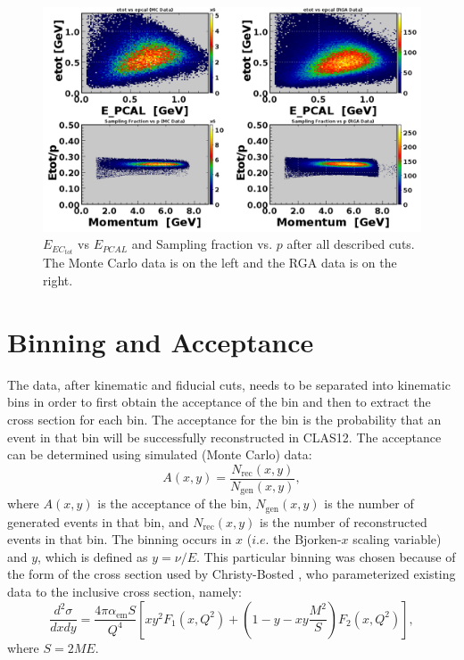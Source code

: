 \begin{figure}[h!]
	\centering
	\includegraphics[width=0.9\linewidth]{figures/rga/sampFrac.png}
	\caption{$E_{EC_{tot}}$ vs $E_{PCAL}$ and Sampling fraction vs. $p$ after all described cuts. The Monte Carlo data is on the left and the RGA data is on the right.}
	\label{fig:rga_sampFrac}
\end{figure}

\cleardoublepage
\section{Binning and Acceptance}
The data, after kinematic and fiducial cuts, needs to be separated into kinematic bins in order to first obtain the acceptance of the bin and then to extract the cross section for each bin. The acceptance for the bin is the probability that an event in that bin will be successfully reconstructed in CLAS12. The acceptance can be determined using simulated (Monte Carlo) data:
\begin{equation}
A(x,y) = \frac{N_{\mathrm{rec}}(x,y)}{N_{\mathrm{gen}}(x,y)},
\end{equation}
where $A(x,y)$ is the acceptance of the bin, $N_{\mathrm{gen}}(x,y)$ is the number of generated events in that bin, and $N_{\mathrm{rec}}(x,y)$ is the number of reconstructed events in that bin. The binning occurs in $x$ ($i.e.$ the Bjorken-$x$ scaling variable) and $y$, which is defined as $y = \nu/E$. This particular binning was chosen because of the form of the cross section used by Christy-Bosted \cite{christy_bosted}, who parameterized existing data to the inclusive cross section, namely:
\begin{equation}
\label{eq:dis_xsec}
\frac{d^2\sigma}{dxdy} = \frac{4\pi\alpha_{\mathrm{em}}S}{Q^4} \left[ xy^2 F_1(x,Q^2) + \left( 1-y-xy\frac{M^2}{S} \right) F_2(x,Q^2) \right],
\end{equation}
where $S = 2ME$.

